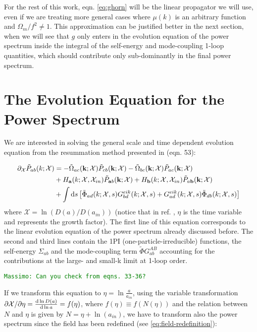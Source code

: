 For the rest of this work, eqn. \ref{eq:ghorn} will be the linear
propagator we will use, even if we are treating more general cases
where $\mu(k)$ is an arbitrary function and $\Omega_{m}/f^{2}\neq1$.
This approximation can be justified better in the next section, when
we will see that $g$ only enters in the evolution equation of the
power spectrum inside the integral of the self-energy and mode-coupling
1-loop quantities, which should contribute only sub-dominantly in
the final power spectrum.


\section{The Evolution Equation for the Power Spectrum \label{sec:The-Evolution-Equation}}

We are interested in solving the general scale and time dependent
evolution equation from the resummation method presented in \cite{anselmi_nonlinear_2012}
(eqn. 53):

\begin{align}
\partial_{\mathcal{X}}\tilde{P}_{ab}(k;\mathcal{X}) & =-\tilde{\Omega}_{ac}(\mathbf{k};\mathcal{X})\tilde{P}_{cb}(\mathbf{k};\mathcal{X})-\tilde{\Omega}_{bc}(\mathbf{k};\mathcal{X})\tilde{P}_{ac}(\mathbf{k};\mathcal{X})\label{eq:evolution-eqn-Chi}\\
 & +H_{\mathbf{a}}(k;\mathcal{X},\mathcal{X}_{in})\tilde{P}_{\mathbf{a}b}(\mathbf{k};\mathcal{X})+H_{\mathbf{b}}(k;\mathcal{X},\mathcal{X}_{in})\tilde{P}_{a\mathbf{b}}(\mathbf{k};\mathcal{X})\nonumber \\
 & +\int\mathrm{d} s\left[\tilde{\Phi}_{ad}(k;\mathcal{X},s)G_{bd}^{eik}(k;\mathcal{X},s)+G_{ad}^{eik}(k;\mathcal{X},s)\tilde{\Phi}_{db}(k;\mathcal{X},s)\right]\nonumber 
\end{align}
where $\mathcal{X}=\ln(D(a)/D(a_{in}))$ (notice that in ref. \cite{anselmi_nonlinear_2012},
$\eta$ is the time variable and represents the growth factor). The
first line of this equation corresponds to the linear evolution equation
of the power spectrum already discussed before. The second and third
lines contain the 1PI (one-particle-irreducible) functions, the self-energy
$\Sigma_{ab}$ and the mode-coupling term $\tilde{\Phi}G_{ab}^{AB}$\textbf{
}accounting for the contributions at the large- and small-k limit
at 1-loop order.

\texttt{\textcolor{green}{Massimo: Can you check from eqns. 33-36? }}

If we transform this equation to $\eta=\ln\frac{a}{a_{in}}$, using
the variable transformation $\partial\mathcal{X}/\partial\eta=\frac{\mathrm{d}\ln D(a)}{\mathrm{d}\ln a}=f(\eta)$,
where $f(\eta)\equiv f(N(\eta))$ and the relation between $N$ and
$\eta$ is given by $N=\eta+\ln(a_{in})$, we have to transform also
the power spectrum since the field has been redefined (see \ref{eq:field-redefinition}):

